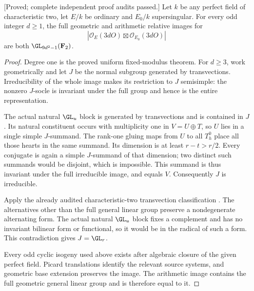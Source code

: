 \begin{theorem}
\label{thm:mixed-every-fixed-modulus-all-odd-candidate}
\textup{[Proved; complete independent proof audits passed.]}
Let $k$ be any perfect field of characteristic two, let $E/k$
be ordinary and $E_0/k$ supersingular. For every odd integer
$d\geq1$, the full geometric and arithmetic relative images
for
\[
       |\mathcal O_E(3dO)\boxtimes\mathcal O_{E_0}(3dO)|
\]
are both $\GL_{9d^2-1}(\mathbf F_2)$.
\end{theorem}
\begin{proof}
Degree one is the proved uniform fixed-modulus theorem.
For $d\geq3$, work geometrically and let $J$ be the normal
subgroup generated by transvections. Irreducibility of the
whole image makes its restriction to $J$ semisimple: the
nonzero $J$-socle is invariant under the full group and hence
is the entire representation.

The actual natural $\GL_u$ block is generated by transvections
and is contained in $J$. Its natural constituent occurs with
multiplicity one in $V=U\oplus T$, so $U$ lies in a single
simple $J$-summand. The rank-one gluing maps from $U$ to all
$T_h^0$ place all those hearts in the same summand. Its dimension
is at least $r-t>r/2$. Every conjugate is again a simple
$J$-summand of that dimension; two distinct such summands
would be disjoint, which is impossible. This summand is thus
invariant under the full irreducible image, and equals $V$.
Consequently $J$ is irreducible.

Apply the already audited characteristic-two transvection
classification \cite[Theorem~3.6, printed p.~22]{KantorSeress2001}.
The alternatives other than the full general linear group
preserve a nondegenerate alternating form. The actual natural
$\GL_u$ block fixes a complement and has no invariant
bilinear form or functional, so it would be in the radical
of such a form. This contradiction gives $J=\GL_r$.

Every odd cyclic isogeny used above exists after algebraic
closure of the given perfect field. Picard translations
identify the relevant source systems, and geometric base
extension preserves the image. The arithmetic image contains
the full geometric general linear group and is therefore
equal to it.
\end{proof}

